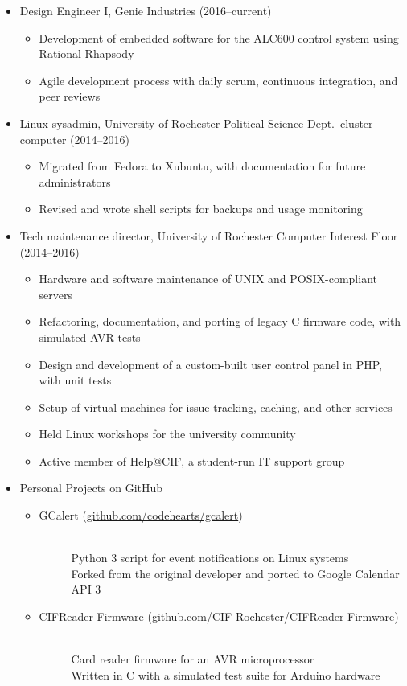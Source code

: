 \documentclass[10pt]{article}
\begin{document}
\begin{itemize}
	\item Design Engineer I, Genie Industries (2016--current)
		\begin{itemize}
			\item Development of embedded software for the ALC600 control system using Rational Rhapsody
			\item Agile development process with daily scrum, continuous integration, and peer reviews
		\end{itemize}
	\item Linux sysadmin, University of Rochester Political Science Dept.\ cluster computer (2014--2016)
		\begin{itemize}
			\item Migrated from Fedora to Xubuntu, with documentation for future administrators
			\item Revised and wrote shell scripts for backups and usage monitoring
		\end{itemize}
	\item Tech maintenance director, University of Rochester Computer Interest Floor (2014--2016)
		\begin{itemize}
			\item Hardware and software maintenance of UNIX and POSIX-compliant servers
			\item Refactoring, documentation, and porting of legacy C firmware code, with simulated AVR tests
			\item Design and development of a custom-built user control panel in PHP, with unit tests
			\item Setup of virtual machines for issue tracking, caching, and other services
			\item Held Linux workshops for the university community
			\item Active member of Help@CIF, a student-run IT support group
		\end{itemize}
	\item Personal Projects on GitHub
		\begin{itemize}
			\item \begin{description}
				\item[GCalert (\href{https://github.com/codehearts/gcalert}{github.com/codehearts/gcalert})] \hfill \\
					Python 3 script for event notifications on Linux systems \\
					Forked from the original developer and ported to Google Calendar API 3
			\end{description}
			\item \begin{description}
				\item[CIFReader Firmware (\href{https://github.com/CIF-Rochester/CIFReader-Firmware}{github.com/CIF-Rochester/CIFReader-Firmware})] \hfill \\
					Card reader firmware for an AVR microprocessor \\
					Written in C with a simulated test suite for Arduino hardware
			\end{description}
		\end{itemize}
\end{itemize}
\end{document}
